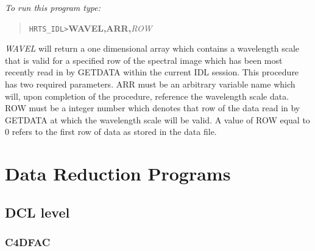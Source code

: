 {\em To run this program type:}
\begin{quote}
{\tt HRTS\_IDL>}{\bf WAVEL,ARR,}{\it ROW}
\end{quote}
{\em WAVEL} will return a one dimensional array which contains a
   wavelength scale that is valid for a specified row of the spectral
   image which has been most recently read in by GETDATA within the
   current IDL session.  This procedure has two required parameters.  ARR
   must be an arbitrary variable name which will, upon completion of the
   procedure, reference the wavelength scale data.  ROW must be a integer
   number which denotes that row of the data read in by GETDATA at which
   the wavelength scale will be valid.  A value of ROW equal to 0 refers
   to the first row of data as stored in the data file.
\newpage

\section{Data Reduction Programs}

\subsection{DCL level}

\subsubsection{C4DFAC}

